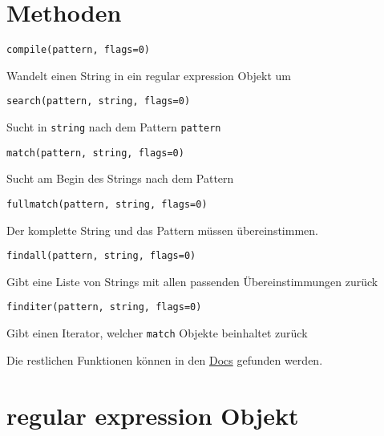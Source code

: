 \documentclass[ignorenonframetext,]{beamer}
\begin{document}
\section{Methoden}\label{methoden}

\begin{frame}[fragile]

\begin{verbatim}
compile(pattern, flags=0)
\end{verbatim}

Wandelt einen String in ein regular expression Objekt um

\begin{verbatim}
search(pattern, string, flags=0)
\end{verbatim}

Sucht in \texttt{string} nach dem Pattern \texttt{pattern}

\begin{verbatim}
match(pattern, string, flags=0)
\end{verbatim}

Sucht am Begin des Strings nach dem Pattern

\begin{verbatim}
fullmatch(pattern, string, flags=0)
\end{verbatim}

Der komplette String und das Pattern müssen übereinstimmen.

\end{frame}

\begin{frame}[fragile]

\begin{verbatim}
findall(pattern, string, flags=0)
\end{verbatim}

Gibt eine Liste von Strings mit allen passenden Übereinstimmungen zurück

\begin{verbatim}
finditer(pattern, string, flags=0)
\end{verbatim}

Gibt einen Iterator, welcher \texttt{match} Objekte beinhaltet zurück

Die restlichen Funktionen können in den
\href{https://docs.python.org/3/library/re.html}{Docs} gefunden werden.

\end{frame}

\section{regular expression Objekt}\label{regular-expression-objekt}
\end{document}
